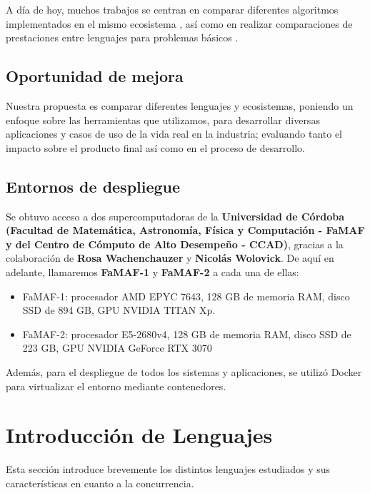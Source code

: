 \documentclass[11pt]{article}
\let\Oldsection\section
\renewcommand{\section}{\FloatBarrier\Oldsection}
\let\Oldsubsection\subsection
\renewcommand{\subsection}{\FloatBarrier\Oldsubsection}
\begin{document}
A día de hoy, muchos trabajos se centran en comparar diferentes algoritmos implementados en el mismo ecosistema \cite{state_of_the_art:crypto_benchmarks} \cite{state_of_the_art:nn_benchmarks}, así como en realizar comparaciones de prestaciones entre lenguajes para problemas básicos \cite{state_of_the_art:lang_benchmarks}.

\subsection{Oportunidad de mejora}

Nuestra propuesta es comparar diferentes lenguajes y ecosistemas, poniendo un enfoque sobre las
herramientas que utilizamos, para desarrollar diversas aplicaciones y casos de uso de la vida real en la
industria; evaluando tanto el impacto sobre el producto final así como en el proceso de desarrollo.

\subsection{Entornos de despliegue} \label{sec:deploy_envs}

Se obtuvo acceso a dos supercomputadoras de la \textbf{Universidad de Córdoba (Facultad de Matemática, Astronomía, Física y Computación - FaMAF y del Centro de Cómputo de Alto Desempeño - CCAD)}, gracias a la colaboración de \textbf{Rosa Wachenchauzer
} y \textbf{Nicolás Wolovick}. De aquí en adelante, llamaremos \textbf{FaMAF-1} y \textbf{FaMAF-2} a cada una de ellas:

\begin{itemize}
    \item FaMAF-1: procesador AMD EPYC 7643, 128 GB de memoria RAM, disco SSD de 894 GB, GPU NVIDIA TITAN Xp.
    \item FaMAF-2: procesador E5-2680v4, 128 GB de memoria RAM, disco SSD de 223 GB, GPU NVIDIA GeForce RTX 3070
\end{itemize}

Además, para el despliegue de todos los sistemas y aplicaciones, se utilizó Docker \cite{com:docker} para virtualizar el entorno mediante contenedores.

\newpage

\section{Introducción de Lenguajes}

Esta sección introduce brevemente los distintos lenguajes estudiados y sus características en cuanto a la concurrencia.
\end{document}
